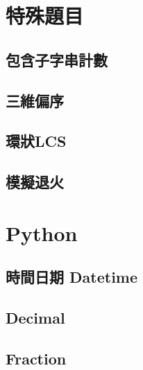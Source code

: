 \section{特殊題目}

\subsection{包含子字串計數}


\subsection{三維偏序}


\subsection{環狀LCS}


\subsection{模擬退火}

\section{Python}

\subsection{時間日期 Datetime}


\subsection{Decimal}


\subsection{Fraction}



